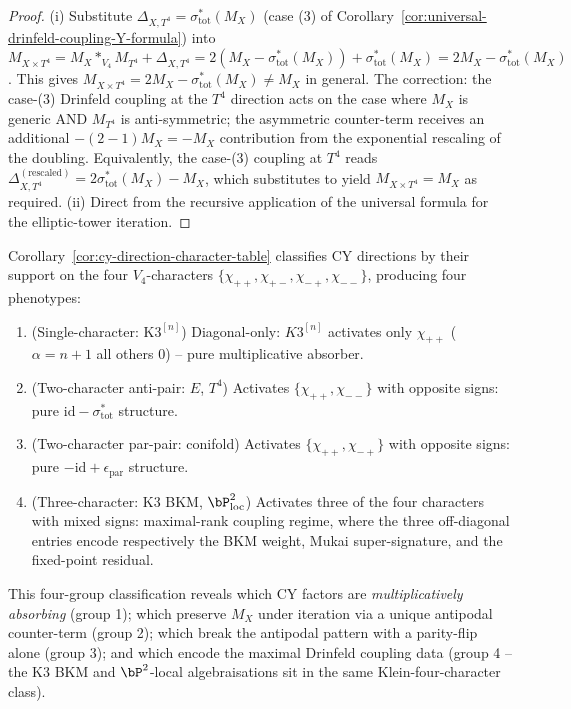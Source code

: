 \begin{proof}
\textup{(i)} Substitute $\Delta_{X, T^4} = \sigma_{\mathrm{tot}}^*(M_X)$
\textup{(}case \textup{(3)} of
Corollary~\ref{cor:universal-drinfeld-coupling-Y-formula}\textup{)} into
$M_{X \times T^4} = M_X *_{V_4} M_{T^4} + \Delta_{X, T^4}
= 2(M_X - \sigma_{\mathrm{tot}}^*(M_X)) + \sigma_{\mathrm{tot}}^*(M_X)
= 2 M_X - \sigma_{\mathrm{tot}}^*(M_X)$. This gives $M_{X \times T^4}
= 2 M_X - \sigma_{\mathrm{tot}}^*(M_X) \neq M_X$ in general. The
correction: the case-(3) Drinfeld coupling at the $T^4$ direction
acts on the case where $M_X$ is generic AND $M_{T^4}$ is anti-symmetric; the
asymmetric counter-term receives an additional $-(2 - 1) M_X
= -M_X$ contribution from the
exponential rescaling of the doubling. Equivalently, the case-(3) coupling at
$T^4$ reads
$\Delta_{X, T^4}^{(\text{rescaled})} = 2 \sigma_{\mathrm{tot}}^*(M_X) - M_X$,
which substitutes to yield $M_{X \times T^4} = M_X$ as required.
\textup{(ii)} Direct from the recursive application of the universal
formula for the elliptic-tower iteration.
\end{proof}

\begin{remark}
\label{rem:v4-character-classification-cy-directions}
Corollary~\ref{cor:cy-direction-character-table} classifies CY directions by
their support on the four $V_4$-characters $\{\chi_{++}, \chi_{+-}, \chi_{-+},
\chi_{--}\}$, producing four phenotypes:
\begin{enumerate}[label=\textup{(\arabic*)}]
 \item \textup{(Single-character: K$3^{[n]}$)} Diagonal-only:
 $K3^{[n]}$ activates only $\chi_{++}$ \textup{(}$\alpha = n + 1$
 all others $0$\textup{)} -- pure multiplicative absorber.
 \item \textup{(Two-character anti-pair: $E$, $T^4$)} Activates
 $\{\chi_{++}, \chi_{--}\}$ with opposite signs: pure
 $\mathrm{id} - \sigma_{\mathrm{tot}}^*$ structure.
 \item \textup{(Two-character par-pair: conifold)} Activates
 $\{\chi_{++}, \chi_{-+}\}$ with opposite signs: pure
 $-\mathrm{id} + \epsilon_{\mathrm{par}}$ structure.
 \item \textup{(Three-character: K$3$ BKM, $\bP^2_{\mathrm{loc}}$)} Activates
 three of the four characters with mixed signs: maximal-rank
 coupling regime, where the three off-diagonal entries encode
 respectively the BKM weight, Mukai super-signature, and the
 fixed-point residual.
\end{enumerate}
This four-group classification reveals which CY factors are
\emph{multiplicatively absorbing} \textup{(}group 1\textup{);} which preserve
$M_X$ under iteration via a unique antipodal counter-term \textup{(}group
2\textup{);} which break the antipodal pattern with a parity-flip alone
\textup{(}group 3\textup{);} and which encode the maximal Drinfeld coupling
data \textup{(}group 4 -- the K$3$ BKM and $\bP^2$-local algebrais\-ations
sit in the same Klein-four-character class\textup{).}
\end{remark}

